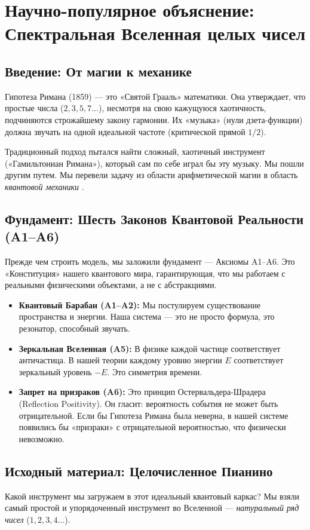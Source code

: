 \documentclass{article}
\numberwithin{equation}{section}
\theoremstyle{plain}
\theoremstyle{definition}
\theoremstyle{remark}
\begin{document}
\appendix
\section{Научно-популярное объяснение: Спектральная Вселенная целых чисел}
\label{sec:popular_explanation}

\subsection*{Введение: От магии к механике}
Гипотеза Римана (1859) — это «Святой Грааль» математики. Она утверждает, что простые числа ($2, 3, 5, 7\dots$), несмотря на свою кажущуюся хаотичность, подчиняются строжайшему закону гармонии. Их «музыка» (нули дзета-функции) должна звучать на одной идеальной частоте (критической прямой $1/2$).

Традиционный подход пытался найти сложный, хаотичный инструмент («Гамильтониан Римана»), который сам по себе играл бы эту музыку. Мы пошли другим путем. Мы перевели задачу из области арифметической магии в область \emph{квантовой механики} .

\subsection*{Фундамент: Шесть Законов Квантовой Реальности (A1–A6)}
Прежде чем строить модель, мы заложили фундамент — Аксиомы A1–A6. Это «Конституция» нашего квантового мира, гарантирующая, что мы работаем с реальными физическими объектами, а не с абстракциями.

\begin{itemize}
    \item \textbf{Квантовый Барабан (A1–A2):} Мы постулируем существование пространства и энергии. Наша система — это не просто формула, это резонатор, способный звучать.
    \item \textbf{Зеркальная Вселенная (A5):} В физике каждой частице соответствует античастица. В нашей теории каждому уровню энергии $E$ соответствует зеркальный уровень $-E$. Это симметрия времени.
    \item \textbf{Запрет на призраков (A6):} Это принцип Остервальдера-Шрадера (Reflection Positivity). Он гласит: вероятность события не может быть отрицательной. Если бы Гипотеза Римана была неверна, в нашей системе появились бы «призраки» с отрицательной вероятностью, что физически невозможно.
\end{itemize}

\subsection*{Исходный материал: Целочисленное Пианино}
Какой инструмент мы загружаем в этот идеальный квантовый каркас?
Мы взяли самый простой и упорядоченный инструмент во Вселенной — \emph{натуральный ряд чисел} ($1, 2, 3, 4\dots$).
\end{document}
